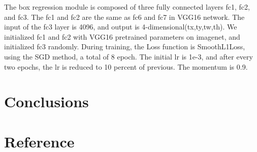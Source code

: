 \documentclass[final,3p,times,twocolumn]{elsarticle}
\begin{document}
The box regression module is composed of three fully connected layers fc1, fc2, and fc3. The fc1 and fc2 are the same as fc6 and fc7 in VGG16 network. The input of the fc3 layer is 4096, and output is 4-dimensional(tx,ty,tw,th). We initialized fc1 and fc2 with VGG16 pretrained parameters on imagenet, and initialized fc3 randomly. During training, the Loss function is SmoothL1Loss, using the SGD method, a total of 8 epoch. The initial lr is 1e-3, and after every two epochs, the lr is reduced to 10 percent of previous. The momentum is 0.9.

\section{Conclusions}

















\section*{Reference}


\end{document}
